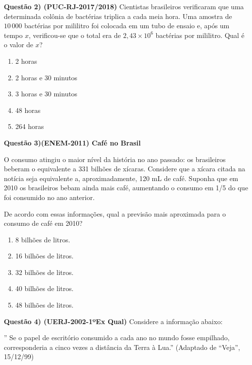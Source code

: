\textbf{Questão 2) (PUC-RJ-2017/2018)} Cientistas brasileiros verificaram que uma determinada colônia de bactérias triplica a cada meia hora. Uma amostra de \(10\,000\) bactérias por mililitro foi colocada em um tubo de ensaio e, após um tempo \(x\), verificou-se que o total era de \(2,43 \times 10^{6}\) bactérias por mililitro. Qual é o valor de \(x\)?
\begin{enumerate}
\item {} 
2 horas

\item {} 
2 horas e 30 minutos

\item {} 
3 horas e 30 minutos

\item {} 
48 horas

\item {} 
264 horas

\end{enumerate}

\textbf{Questão 3)(ENEM-2011) Café no Brasil}

O consumo atingiu o maior nível da história no ano passado: os brasileiros beberam o equivalente a 331 bilhões de xícaras.
Considere que a xícara citada na notícia seja equivalente a, aproximadamente, 120 mL de café. Suponha que em 2010 os brasileiros bebam ainda mais café, aumentando o consumo em 1/5 do que foi consumido no ano anterior.

De acordo com essas informações, qual a previsão mais aproximada para o consumo de café em 2010?
\begin{enumerate}
\item {} 
8 bilhões de litros.

\item {} 
16 bilhões de litros.

\item {} 
32 bilhões de litros.

\item {} 
40 bilhões de litros.

\item {} 
48 bilhões de litros.

\end{enumerate}

\textbf{Questão 4) (UERJ-2002-1ºEx Qual)} Considere a informação abaixo:

” Se o papel de escritório consumido a cada ano no mundo fosse empilhado, corresponderia a cinco vezes a distância da Terra à Lua.” (Adaptado de “Veja”, 15/12/99)

